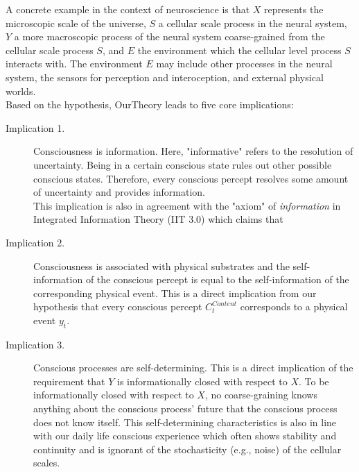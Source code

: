 \documentclass[utf8]{article}
\begin{document}
        A concrete example in the context of neuroscience is that $X$ represents the microscopic scale of the universe, $S$ a cellular scale process in the neural system, $Y$ a more macroscopic process of the neural system coarse-grained from the cellular scale process $S$, and $E$ the environment which the cellular level process $S$ interacts with.  The environment $E$ may include other processes in the neural system, the sensors for perception and interoception, and external physical worlds.\\
        
        Based on the hypothesis, \ac{OurTheory} leads to five core implications: 
        \begin{description}
            \item[Implication 1.] 
            Consciousness is information. Here, "informative" refers to the resolution of uncertainty. Being in a certain conscious state rules out other possible conscious states. Therefore, every conscious percept resolves some amount of uncertainty and provides information. \\ 
            This implication is also in agreement with the "axiom" of \textit{information} in Integrated Information Theory (IIT 3.0) which claims that 
            
            \item[Implication 2.] 
            Consciousness is associated with physical substrates and the self-information of the conscious percept is equal to the self-information of the corresponding physical event. This is a direct implication from our hypothesis that every conscious percept $C_t^{Content}$ corresponds to a physical event $y_t$. 
            
            
            \item[Implication 3.] 
            Conscious processes are self-determining. This is a direct implication of the requirement that $Y$ is informationally closed with respect to $X$. To be informationally closed with respect to $X$, no coarse-graining knows anything about the conscious process' future that the conscious process does not know itself. This self-determining characteristics is also in line with our daily life conscious experience which often shows stability and continuity and is ignorant of the stochasticity (e.g., noise) of the cellular scales.
            


\end{description}
\end{document}
